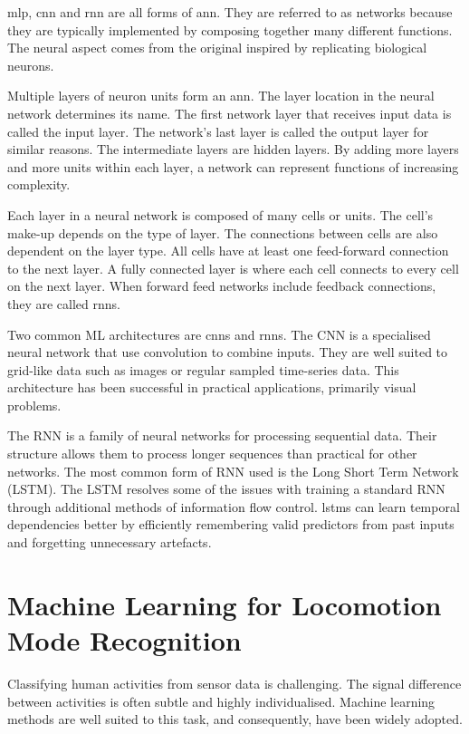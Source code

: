 \acrshort{mlp}, \acrshort{cnn} and \acrshort{rnn} are all forms of \acrfull{ann}. They are referred to as networks because they are typically implemented by composing together many different functions. The neural aspect comes from the original inspired by replicating biological neurons.

Multiple layers of neuron units form an \acrshort{ann}. The layer location in the neural network determines its name. The first network layer that receives input data is called the input layer. The network's last layer is called the output layer for similar reasons. The intermediate layers are hidden layers. By adding more layers and more units within each layer, a network can represent functions of increasing complexity\cite{Goodfellow2015}.

Each layer in a neural network is composed of many cells or units. The cell's make-up depends on the type of layer. The connections between cells are also dependent on the layer type. All cells have at least one feed-forward connection to the next layer. A fully connected layer is where each cell connects to every cell on the next layer. When forward feed networks include feedback connections, they are called \acrshort{rnn}s.

Two common ML architectures are \acrshort{cnn}s and \acrshort{rnn}s. The CNN is a specialised neural network that use convolution to combine inputs. They are well suited to grid-like data such as images or regular sampled time-series data. This architecture has been successful in practical applications, primarily visual problems.\cite{Goodfellow2015}

The RNN is a family of neural networks for processing sequential data. Their structure allows them to process longer sequences than practical for other networks.\cite{Goodfellow2015} The most common form of RNN used is the Long Short Term Network (LSTM). The LSTM resolves some of the issues with training a standard RNN through additional methods of information flow control\cite{Hochreiter1997}. \acrshort{lstm}s can learn temporal dependencies better by efficiently remembering valid predictors from past inputs and forgetting unnecessary artefacts\cite{Hernandez2021}.



\section{Machine Learning for Locomotion Mode Recognition}
\label{sec:background-ml-lmr}
Classifying human activities from sensor data is challenging. The signal difference between activities is often subtle and highly individualised.\cite{Zhu2019} Machine learning methods are well suited to this task, and consequently, have been widely adopted\cite{Wang2019b}.

